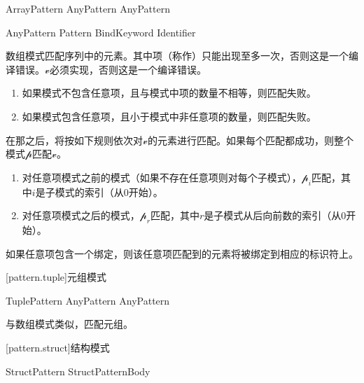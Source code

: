 \begin{bnf}{ArrayPattern}
    \terminal{[} AnyPattern \bnflp\terminal{,} AnyPattern\bnfrp\bnfs\ \terminal{]}
\end{bnf}

\begin{bnf}{AnyPattern}
    Pattern\br
     \br
    BindKeyword  Identifier
\end{bnf}

\pnum
数组模式匹配序列中的元素。其中项（称作）只能出现至多一次，否则这是一个编译错误。$\mathcal{v}$必须实现，否则这是一个编译错误。

\begin{enumerate}
    \item 如果模式不包含任意项，且与模式中项的数量不相等，则匹配失败。
    \item 如果模式包含任意项，且小于模式中非任意项的数量，则匹配失败。
\end{enumerate}

\pnum
在那之后，将按如下规则依次对$\mathcal{v}$的元素进行匹配。如果每个匹配都成功，则整个模式$\mathcal{p}$匹配$\mathcal{v}$。

\begin{enumerate}
    \item 对任意项模式之前的模式（如果不存在任意项则对每个子模式），$\mathcal{p}_i$匹配，其中$i$是子模式的索引（从0开始）。
    \item 对任意项模式之后的模式，$\mathcal{p}_r$匹配，其中$r$是子模式从后向前数的索引（从0开始）。
\end{enumerate}

\pnum
如果任意项包含一个绑定，则该任意项匹配到的元素将被绑定到相应的标识符上。

[pattern.tuple]{元组模式}

\begin{bnf}{TuplePattern}
    \terminal{(} AnyPattern \bnflp\terminal{,} AnyPattern\bnfrp\bnfs\ \terminal{)}
\end{bnf}

\pnum
与数组模式类似，匹配元组。

[pattern.struct]{结构模式}

\begin{bnf}{StructPattern}
    \terminal{\{} StructPatternBody \terminal{\}}
\end{bnf}

